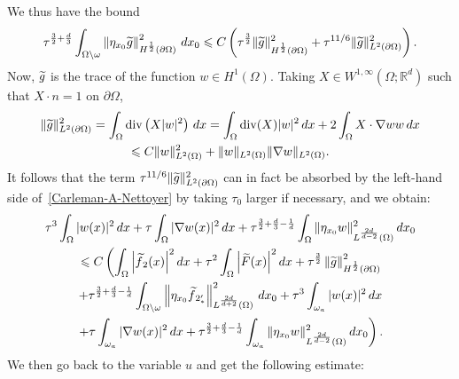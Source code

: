 \documentclass[AHL,Unicode,longabstracts]{cedram}
\newcommand*\R{\mathbb{R}}
\newcommand{\norm}[1]{\left\Vert#1\right\Vert}
\renewcommand{\leq}{\leqslant}
\renewcommand{\tilde}{\widetilde}
\renewcommand{\div}{\operatorname{div}}
\let\oldtilde\tilde
\renewcommand*{\tilde}[1]{\mathchoice{\widetilde{#1}}{\widetilde{#1}}{\oldtilde{#1}}{\oldtilde{#1}}}
\begin{document}
We thus have the bound
\begin{equation*}
\tau^{\frac{3}{2}+\frac{d}{3}} \int_{\Omega \setminus \omega} \norm{ \eta_{x_0} \tilde g}_{H^{\frac{1}{2}}(\partial \Omega)}^2 \, dx_0
\leq C\left(
\tau^{\frac{3}{2}} \| \tilde g \|_{H^{\frac{1}{2}}(\partial \Omega)}^2 + \tau^{11/6} \| \tilde g\|_{L^2(\partial \Omega)}^2\right).
\end{equation*}
Now, $\tilde g$ is the trace of the function $w \in H^1(\Omega)$. Taking $X \in W^{1,\infty}(\Omega; \R^d)$ such that $X \cdot n = 1$ on $\partial \Omega$,
\begin{multline*}
\| \tilde g\|_{L^2(\partial \Omega)}^2 =
\int_{\Omega} \div \left(X |w|^2\right) \, dx =
\int_{\Omega} \div(X) |w|^2 \, dx +2 \int_\Omega X \cdot \nabla w w \, dx \\
\leq C \| w\|_{L^2(\Omega)}^2 + \|w \|_{L^2(\Omega)} \| \nabla w \|_{L^2(\Omega)}.
\end{multline*}
It follows that the term $\tau^{11/6} \| \tilde g\|_{L^2(\partial \Omega)}^2$ can in fact be absorbed by the left-hand side of~\eqref{Carleman-A-Nettoyer} by taking $\tau_0$ larger if necessary, and we obtain:
\begin{multline*}
\tau^3 \int_{\Omega} |w(x)|^2 \, dx +
\tau \int_{\Omega} |\nabla w(x)|^2 \, dx +
\tau^{\frac{3}{2}+\frac{d}{3}-\frac{1}{d}} \int_{\Omega} \| \eta_{x_0} w \|_{L^{\frac{2d}{d-2}}(\Omega)}^2 \, dx_0
\\
\leq  C 
\left(
\int_\Omega  \left|\tilde f_2(x)\right|^2 dx+
\tau^2  \int_\Omega \left|\tilde F(x)\right|^2 dx  + 
\tau^{\frac{3}{2}} \norm{\tilde g }_{H^{\frac{1}{2}}(\partial \Omega)}^2\!\right.
\\
\left.+
\tau^{\frac{3}{2}+\frac{d}{3}-\frac{1}{d}} \int_{\Omega \setminus \omega} \norm{\eta_{x_0} \tilde f_{2_*'}}_{L^{\frac{2d}{d+2}}(\Omega)}^2 \, dx_0
 +
\tau^{3} \int_{\omega_a} |w(x)|^2 \, dx 
\right.
\\
\left.
+
\tau \int_{\omega_a} |\nabla w(x)|^2 \, dx +
\tau^{\frac{3}{2}+\frac{d}{3}-\frac{1}{d}} \int_{ \omega_a} \| \eta_{x_0} w \|_{L^{\frac{2d}{d-2}}(\Omega)}^2 \, dx_0
\right).
\end{multline*}
We then go back to the variable $u$ and get the following estimate:
\end{document}
